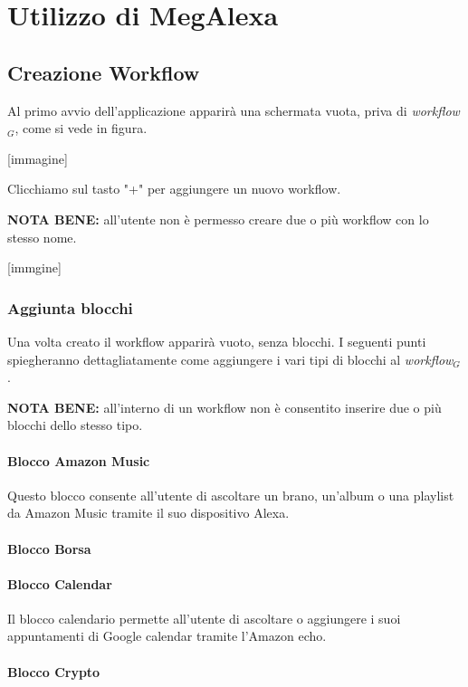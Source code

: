 \chapter{Utilizzo di MegAlexa}
\label{utilizzo}

\section{Creazione Workflow}
Al primo avvio dell'applicazione apparirà una schermata vuota, priva di \textit{workflow$_{G}$}, come si vede in figura.

[immagine]

Clicchiamo sul tasto "+" per aggiungere un nuovo workflow.

\textbf{NOTA BENE:} all'utente non è permesso creare due o più workflow con lo stesso nome.

[immgine]

\subsection{Aggiunta blocchi}
Una volta creato il workflow apparirà vuoto, senza blocchi.
I seguenti punti spiegheranno dettagliatamente come aggiungere i vari tipi di blocchi al \textit{workflow$_{G}$}.

\textbf{NOTA BENE:} all'interno di un workflow non è consentito inserire due o più blocchi dello stesso tipo.

\subsubsection{Blocco Amazon Music}
Questo blocco consente all'utente di ascoltare un brano, un'album o una playlist da Amazon Music tramite il suo dispositivo Alexa.

\subsubsection{Blocco Borsa}

\subsubsection{Blocco Calendar}
Il blocco calendario permette all'utente di ascoltare o aggiungere i suoi appuntamenti di Google calendar tramite l'Amazon echo. 
\subsubsection{Blocco Crypto}
